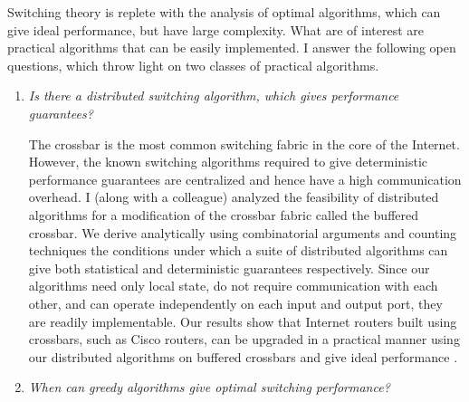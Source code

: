 \documentclass[a4paper, 12pt]{article}
\begin{document}
\begin{small}
Switching theory is replete with the analysis of optimal algorithms, which can give
ideal performance, but have large complexity. What are of interest are practical algorithms that can
be easily implemented. I answer the following open questions, which throw light on two classes of
practical algorithms.

\begin{enumerate}
\item {\em Is there a distributed switching algorithm, which gives performance guarantees?}


The crossbar is the most common switching fabric in the core of the Internet. However,
the known switching algorithms required to give deterministic performance
guarantees are centralized and hence have a high communication overhead.
I (along with a colleague) analyzed the feasibility of distributed algorithms for a
modification of the crossbar fabric called the buffered crossbar.
We derive analytically using combinatorial arguments and counting techniques the
conditions under which a suite of distributed algorithms can give
both statistical and deterministic
guarantees respectively.
Since our algorithms need only local state, do not require communication with each other,
and can operate independently on each input and output port, they are readily implementable.
Our results show that Internet routers built using crossbars, such as Cisco routers, can
be upgraded in a practical manner using our distributed
algorithms on buffered crossbars and give ideal performance \cite{buffxbar}.


\item {\em When can greedy algorithms give optimal switching performance?}


\end{enumerate}
\end{small}
\end{document}

